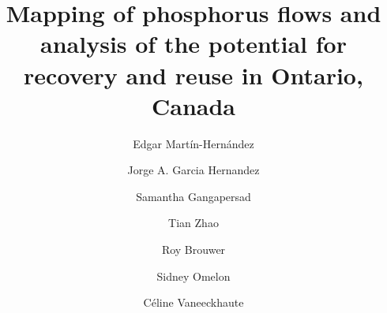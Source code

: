 \documentclass[authoryear]{elsarticle}
\begin{document}
\begin{frontmatter}
	\title{
	Mapping of phosphorus flows and analysis of the potential for recovery and reuse in Ontario, Canada
	}
	
	\author[ULaval]{Edgar Martín-Hernández}
	\author[Waterloo]{Jorge A. Garcia Hernandez}
	\author[McGill]{Samantha Gangapersad}
	\author[McGill]{Tian Zhao}
	\author[Waterloo,TheWaterInstitute]{Roy Brouwer}
	\author[McGill]{Sidney Omelon}
	\author[ULaval,CentrEau]{Céline Vaneeckhaute}
		
	\address[ULaval]{BioEngine - Research Team on Green Process Engineering and Biorefineries, Chemical Engineering Department, Université Laval, 1065 Ave. de la Médecine, Québec, QC, G1V 0A6, Canada}
	\address[CentrEau]{CentrEau, Centre de recherche sur l'eau, Université Laval, 1065 Avenue de la Médecine, Québec, QC, G1V 0A6, Canada}
	\address[McGill]{Department of Mining and Materials	Engineering, McGill University, Montréal, Canada}
	\address[Waterloo]{Department of Economics, University of Waterloo, 200 University Avenue West, Waterloo, ON, N2L 3G1, Canada}
	\address[TheWaterInstitute]{The Water Institute, University of Waterloo, 200 University Avenue West, Waterloo, ON, N2L 3G1, Canada}
	

\end{frontmatter}
\end{document}
